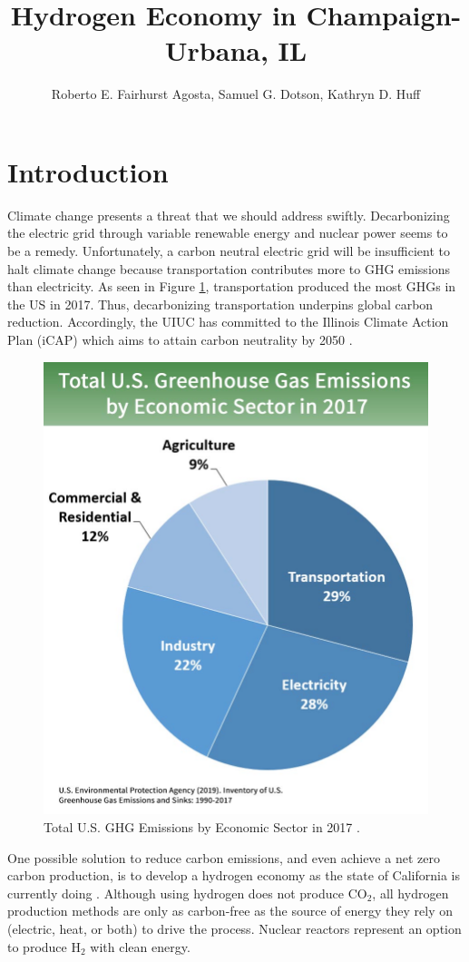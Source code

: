 \documentclass{anstrans}
\title{Hydrogen Economy in Champaign-Urbana, IL}
\author{Roberto E. Fairhurst Agosta, Samuel G. Dotson, Kathryn D. Huff}
\institute{
University of Illinois at Urbana-Champaign, Dept. of Nuclear, Plasma, and Radiological Engineering\\
ref3@illinois.edu
}
\begin{document}
\section{Introduction}

Climate change presents a threat that we should address swiftly. Decarbonizing the electric grid through variable renewable energy and nuclear power seems to be a remedy. Unfortunately, a carbon neutral electric grid will be insufficient to halt climate change because transportation contributes more to \gls{GHG} emissions than electricity. As seen in Figure \ref{fig:ghg}, transportation produced the most \glspl{GHG} in the US in 2017. Thus, decarbonizing transportation underpins global carbon reduction. Accordingly, the \gls{UIUC} has committed to the Illinois Climate Action Plan (iCAP) which aims to attain carbon neutrality by 2050 \cite{noauthor_illlinois_2015}.

\begin{figure}[H]
	\centering
	\includegraphics[width=0.6\linewidth]{figures/total-ghg-2019-caption.jpg}
	\hfill
	\caption{Total U.S. GHG Emissions by Economic Sector in 2017 \cite{us_epa_sources_2020}.}
	\label{fig:ghg}
\end{figure}

One possible solution to reduce carbon emissions, and even achieve a net zero carbon production, is to develop a hydrogen economy as the state of California is currently doing \cite{brown_economic_2013}. 
Although using hydrogen does not produce CO$_2$, all hydrogen production methods are only as carbon-free as the source of energy they rely on (electric, heat, or both) to drive the process.
Nuclear reactors represent an option to produce H$_2$ with clean energy.
\end{document}
